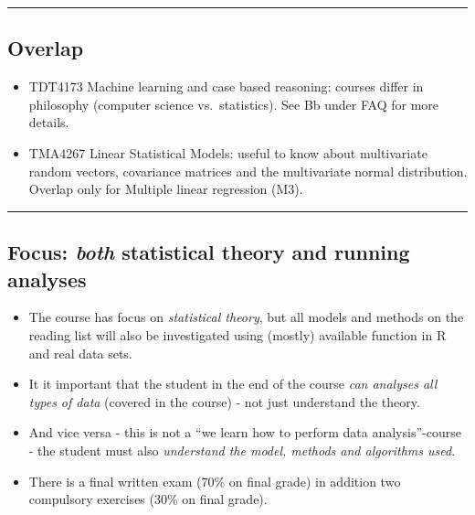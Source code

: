 \documentclass[]{article}
\providecommand{\tightlist}{%
  \setlength{\itemsep}{0pt}\setlength{\parskip}{0pt}}
\begin{document}
\begin{center}\rule{0.5\linewidth}{\linethickness}\end{center}

\hypertarget{overlap}{%
\subsection{Overlap}\label{overlap}}

\begin{itemize}
\tightlist
\item
  TDT4173 Machine learning and case based reasoning: courses differ in
  philosophy (computer science vs.~statistics). See Bb under FAQ for
  more details.
\item
  TMA4267 Linear Statistical Models: useful to know about multivariate
  random vectors, covariance matrices and the multivariate normal
  distribution. Overlap only for Multiple linear regression (M3).
\end{itemize}

\begin{center}\rule{0.5\linewidth}{\linethickness}\end{center}

\hypertarget{focus-both-statistical-theory-and-running-analyses}{%
\subsection{\texorpdfstring{Focus: \emph{both} statistical theory and
running
analyses}{Focus: both statistical theory and running analyses}}\label{focus-both-statistical-theory-and-running-analyses}}

\begin{itemize}
\tightlist
\item
  The course has focus on \emph{statistical theory}, but all models and
  methods on the reading list will also be investigated using (mostly)
  available function in R and real data sets.
\item
  It it important that the student in the end of the course \emph{can
  analyses all types of data} (covered in the course) - not just
  understand the theory.
\item
  And vice versa - this is not a ``we learn how to perform data
  analysis''-course - the student must also \emph{understand the model,
  methods and algorithms used}.
\item
  There is a final written exam (70\% on final grade) in addition two
  compulsory exercises (30\% on final grade).
\end{itemize}
\end{document}
